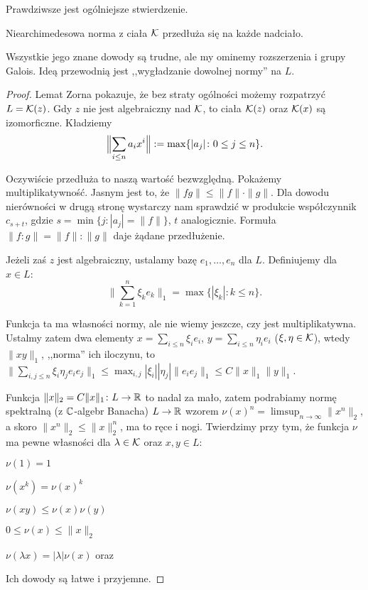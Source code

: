 Prawdziwsze jest ogólniejsze stwierdzenie.

\begin{twierdzenie}[Krull]
	Niearchimedesowa  norma z ciała $\mathcal K$ przedłuża się na każde nadciało.
\end{twierdzenie}

Wszystkie jego znane dowody są trudne, ale my ominemy rozszerzenia i grupy Galois.
Ideą przewodnią jest ,,wygładzanie dowolnej normy'' na $L$.

\begin{proof}
	Lemat Zorna pokazuje, że bez straty ogólności możemy rozpatrzyć $L = \mathcal K(z)$.
	Gdy $z$ nie jest algebraiczny nad $\mathcal K$, to ciała $\mathcal K(z)$ oraz $\mathcal K(x)$ są izomorficzne.
	Kładziemy
	\[
		\Bigl\|\sum_{i\le n} a_i x^i\Bigr\|  := \max \{|a_j| \colon 0 \le j \le n\}.
	\]

	Oczywiście przedłuża to naszą wartość bezwzględną.
	Pokażemy multiplikatywność.
	Jasnym jest to, że $\|fg\| \le \|f\| \cdot \|g\|$.
	Dla dowodu nierówności w drugą stronę wystarczy nam sprawdzić w produkcie współczynnik $c_{s+t}$, gdzie $s = \min \{j : |a_j| = \|f\|\}$, $t$ analogicznie.
	Formuła $\|f:g\| = \|f\|:\|g\|$ daje żądane przedłużenie.

	Jeżeli zaś $z$ jest algebraiczny, ustalamy bazę $e_1, \ldots, e_n$ dla $L$.
	Definiujemy dla $x \in L$:
	\[
		\| \sum_{k=1}^n \xi_k e_k \|_1 = \max \{|\xi_k| : k \le n\}.
	\]

	Funkcja ta ma własności normy, ale nie wiemy jeszcze, czy jest multiplikatywna.
	Ustalmy zatem dwa elementy $x = \sum_{i \le n} \xi_i e_i$, $y = \sum_{i \le n} \eta_i e_i$ ($\xi, \eta \in \mathcal K$), wtedy $\|xy\|_1$, ,,norma'' ich iloczynu, to $\|\sum_{i, j \le n} \xi_i \eta_j e_i e_j \|_1 \le \max_{i, j} |\xi_i| |\eta_j| \|e_ie_j\|_1 \le C \|x\|_1 \|y\|_1.$

	Funkcja $\|x\|_2 = C \|x\|_1 \colon L \to \mathbb R$ to nadal za mało, zatem podrabiamy normę spektralną (z $\mathbb C$-algebr Banacha) $L \to \mathbb R$ wzorem $\nu(x)^n = \limsup_{n \to \infty}\|x^n\|_2$, a skoro $\|x^n\|_2 \le \|x\|_2^n$, ma to ręce i nogi. Twierdzimy przy tym, że funkcja $\nu$ ma pewne własności dla $\lambda \in \mathcal K$ oraz $x, y \in L$: 
	\begin{enumx}
	\item $\nu(1) = 1$
	\item $\nu(x^k) = \nu(x)^k$
	\item $\nu(xy) \le \nu(x) \nu(y)$
	\item $0 \le \nu(x) \le \|x\|_2$
	\item $\nu(\lambda x) = |\lambda| \nu(x)$ oraz 
	\end{enumx}
	Ich dowody są łatwe i przyjemne.


\end{proof}
